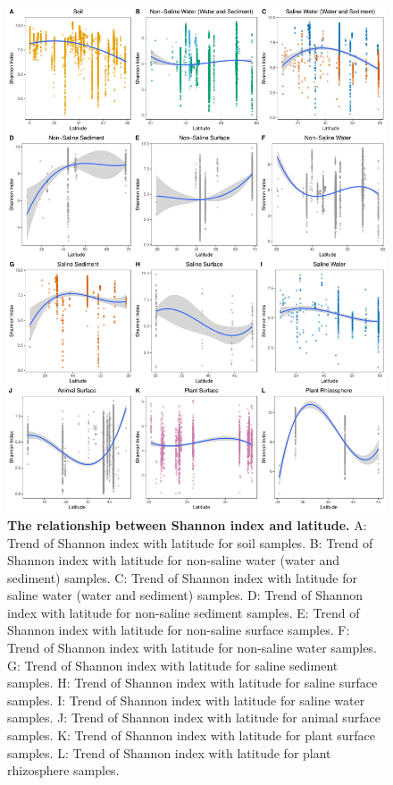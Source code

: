 \begin{figure}[H]
    \centering
    \includegraphics[scale=0.33]{./Figures/Shan_lati_empo3}
    \caption{\textbf{The relationship between Shannon index and latitude.} A: Trend of Shannon index with latitude for soil samples. B: Trend of Shannon index with latitude for non-saline water (water and sediment) samples. C: Trend of Shannon index with latitude for saline water (water and sediment) samples. D: Trend of Shannon index with latitude for non-saline sediment samples. E: Trend of Shannon index with latitude for non-saline surface samples. F: Trend of Shannon index with latitude for non-saline water samples. G: Trend of Shannon index with latitude for saline sediment samples. H: Trend of Shannon index with latitude for saline surface samples. I: Trend of Shannon index with latitude for saline water samples. J: Trend of Shannon index with latitude for animal surface samples. K: Trend of Shannon index with latitude for plant surface samples. L: Trend of Shannon index with latitude for plant rhizosphere samples.}
    \label{fig:Shan_lati3}
\end{figure}



